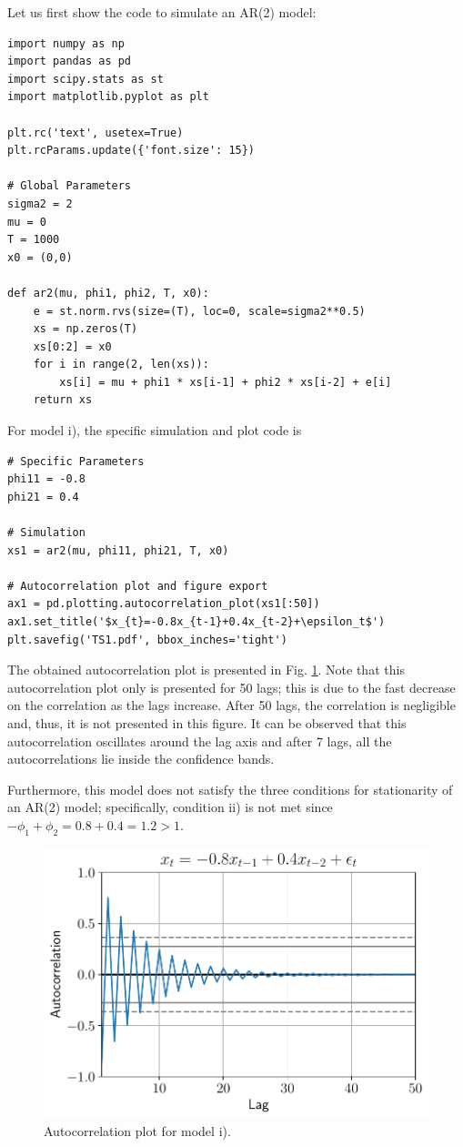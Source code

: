 \documentclass[fleqn]{article}
\begin{document}
\begin{enumerate}
Let us first show the code to simulate an AR(2) model:
\begin{verbatim}
import numpy as np
import pandas as pd
import scipy.stats as st
import matplotlib.pyplot as plt

plt.rc('text', usetex=True)
plt.rcParams.update({'font.size': 15})

# Global Parameters
sigma2 = 2
mu = 0
T = 1000
x0 = (0,0)

def ar2(mu, phi1, phi2, T, x0):
    e = st.norm.rvs(size=(T), loc=0, scale=sigma2**0.5)
    xs = np.zeros(T)
    xs[0:2] = x0
    for i in range(2, len(xs)):
        xs[i] = mu + phi1 * xs[i-1] + phi2 * xs[i-2] + e[i]
    return xs
\end{verbatim}

For model i), the specific simulation and plot code is
\begin{verbatim}
# Specific Parameters
phi11 = -0.8
phi21 = 0.4

# Simulation
xs1 = ar2(mu, phi11, phi21, T, x0)

# Autocorrelation plot and figure export
ax1 = pd.plotting.autocorrelation_plot(xs1[:50])
ax1.set_title('$x_{t}=-0.8x_{t-1}+0.4x_{t-2}+\epsilon_t$')
plt.savefig('TS1.pdf', bbox_inches='tight')
\end{verbatim}

The obtained autocorrelation plot is presented in Fig. \ref{fig:ts1}. Note that this autocorrelation plot only is presented for 50 lags; this is due to the fast decrease on the correlation as the lags increase. After 50 lags, the correlation is negligible and, thus, it is not presented in this figure. It can be observed that this autocorrelation oscillates around the lag axis and after 7 lags, all the autocorrelations lie inside the confidence bands.

Furthermore, this model does not satisfy the three conditions for stationarity of an AR(2) model; specifically, condition ii) is not met since $-\phi_1+\phi_2=0.8+0.4=1.2>1$.


\begin{figure}[H]
    \centering
    \includegraphics[scale=.6]{figs/TS1.pdf}
    \caption{Autocorrelation plot for model i).}
    \label{fig:ts1}
\end{figure}


\end{enumerate}
\end{document}
